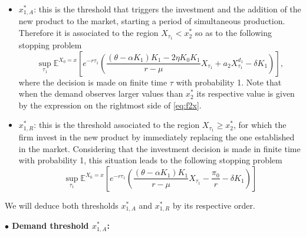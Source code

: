 \begin{itemize}
	\item $x_{1,A}^*$:
	this is the threshold that triggers the investment and the addition of the new product to the market, starting a period of simultaneous production. Therefore it is associated to the region $X_{\tau_1} < x^*_2$ so as to the following stopping problem %
	\begin{equation}
	\sup_{\tau_1} \mathds{E}^{X_0=x} \left[ e^{-r \tau_1} \left( \frac{(\theta-\alpha K_1)K_1-2 \eta K_0 K_1}{r-\mu} X_{\tau_1}+
	 a_2 X_{\tau_1}^{d_1} - \delta K_1 \right) \right],
	 \label{3:add}
	 \end{equation}
	 where the decision is made on finite time $\tau$ with probability 1. Note that when the demand observes larger values than $x^*_2$ its respective value is given by the expression on the rightmost side of \eqref{eq:f2x}.
	\item $x_{1,R}^*$: this is the threshold associated to the region $X_{\tau_1} \geq x^*_2$, for which the firm invest in the new product by immediately replacing the one established in the market. Considering that the investment decision is made in finite time with probability 1, this situation leads to the following stopping problem
	\begin{equation}
	\sup_{\tau_1} \mathds{E}^{X_0=x} \left[ e^{-r \tau_1} \left( \frac{(\theta-\alpha K_1)K_1}{r-\mu} X_{\tau_1}-
	\frac{\pi_0}{r} - \delta K_1 \right) \right]
	\label{3:r}
	\end{equation}
\end{itemize}

We will deduce both thresholds $x_{1,A}^*$ and $x_{1,R}^*$ by its respective order.


\vspace{5mm}
\textbf{$\bullet$ Demand threshold $x^*_{1,A}$:}

